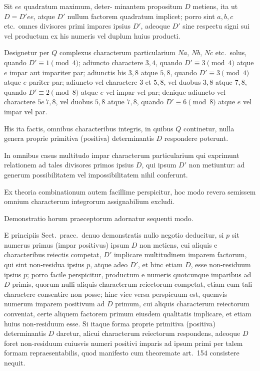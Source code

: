 \documentclass[12pt,a4paper]{article}
\theoremstyle{plain}
\theoremstyle{definition}
\theoremstyle{remark}
\begin{document}
Sit $ee$ quadratum maximum, deter- minantem propositum $D$ metiens, ita ut $D = D'ee$, atque $D'$ nullum factorem quadratum implicet; porro sint $a, b, c$ etc.\ omnes divisores primi impares ipsius $D'$, adeoque $D'$ sine respectu signi sui vel productum ex his numeris vel duplum huius producti.

Designetur per $Q$ complexus characterum particularium $Na$, $Nb$, $Nc$ etc.\ solus, quando $D' \equiv 1 \pmod{4}$; adiuncto charactere $3, 4$, quando $D' \equiv 3 \pmod{4}$ atque $e$ impar aut impariter par; adiunctis his $3, 8$ atque $5, 8$, quando $D' \equiv 3 \pmod{4}$ atque $e$ pariter par; adiuncto vel charactere $3$ et $5, 8$, vel duobus $3, 8$ atque $7, 8$, quando $D' \equiv 2 \pmod{8}$ atque $e$ vel impar vel par; denique adiuncto vel charactere $5e\,7, 8$, vel duobus $5, 8$ atque $7, 8$, quando $D' \equiv 6 \pmod{8}$ atque $e$ vel impar vel par.

His ita factis, omnibus characteribus integris, in quibus $Q$ continetur, nulla genera proprie primitiva (positiva) determinantis $D$ respondere poterunt.

In omnibus casus multitudo impar characterum particularium qui exprimunt relationem ad tales divisores primos ipsius $D$, qui ipsum $D'$ non metiuntur: ad generum possibilitatem vel impossibilitatem nihil conferunt.

Ex theoria combinationum autem facillime perspicitur, hoc modo revera semissem omnium characterum integrorum assignabilium excludi.

Demonstratio horum praeceptorum adornatur sequenti modo.

E principiis Sect.\ praec.\ denuo demonstratis nullo negotio deducitur, si $p$ sit numerus primus (impar positivus) ipsum $D$ non metiens, cui aliquis e characteribus reiectis competat, $D'$ implicare multitudinem imparem factorum, qui sint non-residua ipsius $p$, atque adeo $D'$, et hinc etiam $D$, esse non-residuum ipsius $p$; porro facile perspicitur, productum e numeris quotcunque imparibus ad $D$ primis, quorum nulli aliquis characterum reiectorum competat, etiam cum tali charactere consentire non posse; hinc vice versa perspicuum est, quemvis numerum imparem positivum ad $D$ primum, cui aliquis characterum reiectorum conveniat, certe aliquem factorem primum eiusdem qualitatis implicare, et etiam huius non-residuum esse. Si itaque forma proprie primitiva (positiva) determinantis $D$ daretur, alicui characterum reiectorum respondens, adeoque $D$ foret non-residuum cuiusvis numeri positivi imparis ad ipsum primi per talem formam repraesentabilis, quod manifesto cum theoremate art.\ 154 consistere nequit.
\end{document}
